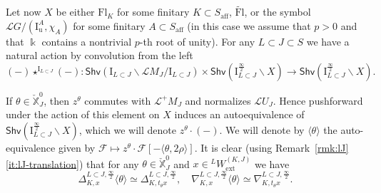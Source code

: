 \documentclass[11pt]{amsart}
\numberwithin{equation}{section}
\theoremstyle{plain}
\theoremstyle{definition}
\newcommand{\sF}{{\mathcal F}}
\newcommand{\I}{{\mathrm I}}
\renewcommand{\k}{\Bbbk}
\newcommand{\sL}{{\mathcal L}}
\newcommand{\X}{{\mathbb X}}
\newcommand{\Xd}{\check{\X}}
\newcommand{\semi}{{{\frac{\infty}{2}}}}
\newcommand{\ex}{\mathrm{ext}}
\newcommand{\af}{\mathrm{aff}}
\newcommand{\Shv}{\mathsf{Shv}}
\newcommand{\Fl}{\mathrm{Fl}}
\newcommand{\tFl}{\widetilde{\Fl}}
\newcommand{\Iu}{\mathrm{I}_{\mathrm{u}}}
\begin{document}
Let now $X$ be either $\Fl_K$ for some finitary $K \subset S_\af$, $\tFl$, or the symbol $\sL G/(\Iu^A,\chi_A)$ for some finitary $A \subset S_\af$ (in this case we assume that $p>0$ and that $\k$ contains a nontrivial $p$-th root of unity). 
For any $L \subset J \subset S$ we have a natural action by convolution from the left 
\[
(-) \star^{\I_{L \subset J}} (-) : \Shv \left( \I_{L \subset J}\backslash \sL{M_J}/\I_{L \subset J} \right) \times \Shv \left( \I_{L \subset J}^{\semi} \backslash X \right) \rightarrow \Shv \left( \I_{L \subset J}^{\semi}\backslash X \right).
\]

If $\theta\in \Xd_J^0$, then $z^\theta$ commutes with $\sL^+ M_J$ and normalizes $\sL U_J$. Hence pushforward under the action of this element on $X$ induces an autoequivalence of $\Shv \left( \I_{L \subset J}^{\semi} \backslash X \right)$, which we will denote $z^\theta \cdot (-)$. We will denote by
$\langle \theta \rangle$ the auto-equivalence given by $\sF\mapsto z^\theta\cdot \sF [-\langle \theta, 2\rho \rangle]$. It is clear (using Remark~\ref{rmk:lJ}\eqref{it:lJ-translation}) that for any $\theta \in \Xd_J^0$ and $x \in {}^L W_\ex^{(K,J)}$ we have
\begin{equation}
\label{eqn:D-N-shift}
\Delta^{L \subset J, \semi}_{K,x} \langle \theta \rangle \simeq \Delta^{L \subset J, \semi}_{K,t_\theta x}, \quad
\nabla^{L \subset J, \semi}_{K,x} \langle \theta \rangle \simeq \nabla^{L \subset J, \semi}_{K,t_\theta x}.
\end{equation}
\end{document}
